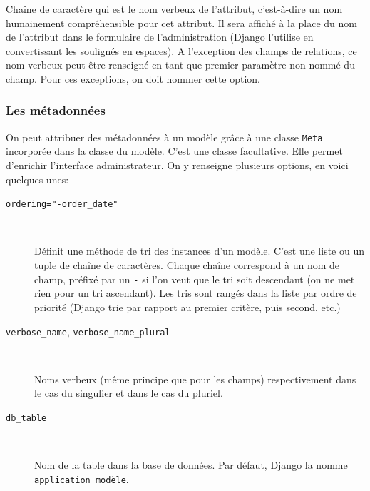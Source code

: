 \documentclass[a4paper, 10pt]{article}
\begin{document}
{\begin{description}
    Chaîne de caractère qui est le \og nom verbeux \fg{} de l'attribut, c'est-à-dire un nom humainement compréhensible pour cet attribut. Il sera affiché à la place du nom de l'attribut dans le formulaire de l'administration (Django l'utilise en convertissant les soulignés en espaces). A l'exception des champs de relations, ce nom verbeux peut-être renseigné en tant que premier paramètre non nommé du champ. Pour ces exceptions, on doit nommer cette option.
\end{description}

\subsubsection{Les métadonnées}
On  peut attribuer des métadonnées à un modèle grâce à une classe \texttt{Meta} incorporée dans la classe du modèle. C'est une classe facultative. Elle permet d'enrichir l'interface administrateur. On y renseigne plusieurs options, en voici quelques unes:
\begin{description}
    \item[\texttt{ordering="-order_date"}]~

    Définit une méthode de tri des instances d'un modèle. C'est une liste ou un tuple de chaîne de caractères. Chaque chaîne correspond à un nom de champ, préfixé par un \texttt{-} si l'on veut que le tri soit descendant (on ne met rien pour un tri ascendant). Les tris sont rangés dans la liste par ordre de priorité (Django trie par rapport au premier critère, puis second, etc.)

    \item[\texttt{verbose_name}, \texttt{verbose_name_plural}]~

    Noms verbeux (même principe que pour les champs) respectivement dans le cas du singulier et dans le cas du pluriel.

    \item[\texttt{db_table}]~

    Nom de la table dans la base de données. Par défaut, Django la nomme \texttt{application\_modèle}.
\end{description}

}
\end{document}
